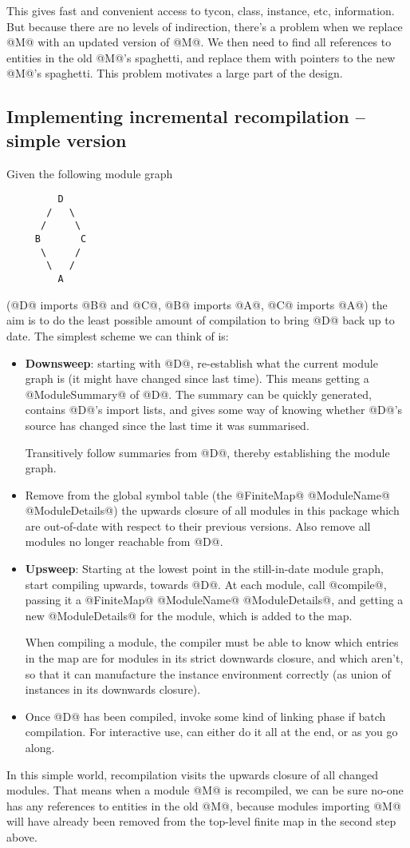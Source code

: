 \documentclass[11pt]{article}
\begin{document}
This gives fast and convenient access to tycon, class, instance,
etc, information.  But because there are no levels of indirection,
there's a problem when we replace @M@ with an updated version of @M@.
We then need to find all references to entities in the old @M@'s
spaghetti, and replace them with pointers to the new @M@'s spaghetti.
This problem motivates a large part of the design.



\subsection{Implementing incremental recompilation -- simple version}
Given the following module graph
\begin{verbatim}
         D
       /   \
      /     \
     B       C
      \     /
       \   /
         A
\end{verbatim}
(@D@ imports @B@ and @C@, @B@ imports @A@, @C@ imports @A@) the aim is to do the
least possible amount of compilation to bring @D@ back up to date.  The
simplest scheme we can think of is:
\begin{itemize}
\item {\bf Downsweep}: 
  starting with @D@, re-establish what the current module graph is
  (it might have changed since last time).  This means getting a
  @ModuleSummary@ of @D@.  The summary can be quickly generated,
  contains @D@'s import lists, and gives some way of knowing whether
  @D@'s source has changed since the last time it was summarised.

  Transitively follow summaries from @D@, thereby establishing the
  module graph.
\item
  Remove from the global symbol table (the @FiniteMap@ @ModuleName@
  @ModuleDetails@) the upwards closure of all modules in this package
  which are out-of-date with respect to their previous versions.  Also
  remove all modules no longer reachable from @D@.
\item {\bf Upsweep}:
  Starting at the lowest point in the still-in-date module graph,
  start compiling upwards, towards @D@.  At each module, call
  @compile@, passing it a @FiniteMap@ @ModuleName@ @ModuleDetails@,
  and getting a new @ModuleDetails@ for the module, which is added to
  the map.

  When compiling a module, the compiler must be able to know which
  entries in the map are for modules in its strict downwards closure,
  and which aren't, so that it can manufacture the instance
  environment correctly (as union of instances in its downwards
  closure).
\item
  Once @D@ has been compiled, invoke some kind of linking phase
  if batch compilation.  For interactive use, can either do it all
  at the end, or as you go along.
\end{itemize}
In this simple world, recompilation visits the upwards closure of
all changed modules.  That means when a module @M@ is recompiled,
we can be sure no-one has any references to entities in the old @M@,
because modules importing @M@ will have already been removed from the 
top-level finite map in the second step above.
\end{document}
